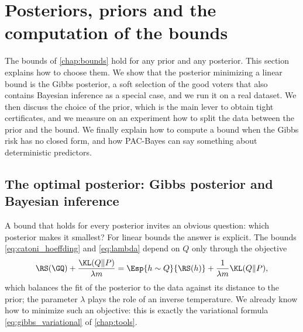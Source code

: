 \section{Posteriors, priors and the computation of the bounds}
\label{chap:posteriors}

\begin{objectives}
The bounds of \cref{chap:bounds} hold for any prior and any posterior. This
section explains how to choose them. We show that the posterior minimizing a
linear bound is the Gibbs posterior, a soft selection of the good voters that
also contains Bayesian inference as a special case, and we run it on a real
dataset. We then discuss the choice of the prior, which is the main lever to
obtain tight certificates, and we measure on an experiment how to split the data
between the prior and the bound. We finally explain how to compute a bound
when the Gibbs risk has no closed form, and how PAC-Bayes can say something about
deterministic predictors.
\end{objectives}

\subsection{The optimal posterior: Gibbs posterior and Bayesian inference}
\label{sec:gibbs_posterior}

A bound that holds for every posterior invites an obvious question: which
posterior makes it smallest? For linear bounds the answer is explicit. The
bounds \eqref{eq:catoni_hoeffding} and \eqref{eq:lambda} depend on
$Q$ only through the objective
\begin{equation}\label{eq:objective_linear}
\RS(\GQ)+\frac{\KL(Q\|P)}{\lambda m}
=\Esp{h\sim Q}{\RS(h)}+\frac{1}{\lambda m}\KL(Q\|P),
\end{equation}
which balances the fit of the posterior to the data against its distance to the
prior; the parameter $\lambda$ plays the role of an inverse temperature. We
already know how to minimize such an objective: this is exactly the variational formula
\eqref{eq:gibbs_variational} of \cref{chap:tools}.

